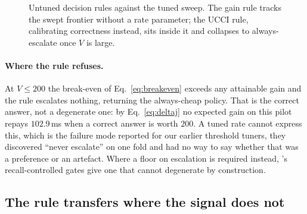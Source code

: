 \documentclass[10pt,twocolumn]{article}
\theoremstyle{plain}
\begin{document}
\begin{figure}[t]
\centering
{}
\caption{Untuned decision rules against the tuned sweep. The gain rule tracks
the swept frontier without a rate parameter; the UCCI rule, calibrating
correctness instead, sits inside it and collapses to always-escalate once $V$ is
large.}
\label{fig:rule}
\end{figure}

\paragraph{Where the rule refuses.} At $V \le 200$ the break-even of
Eq.~\ref{eq:breakeven} exceeds any attainable gain and the rule escalates
nothing, returning the always-cheap policy. That is the correct answer, not a
degenerate one: by Eq.~\ref{eq:deltaj} no expected gain on this pilot repays
$102.9$\,ms when a correct answer is worth $200$. A tuned rate cannot express
this, which is the failure mode reported for our earlier threshold tuners, they
discovered ``never escalate'' on one fold and had no way to say whether that was
a preference or an artefact. Where a floor on escalation is required instead,
\cite{recall}'s recall-controlled gates give one that cannot degenerate by
construction.


\subsection{The rule transfers where the signal does not}
\label{sec:transfer}
\end{document}
